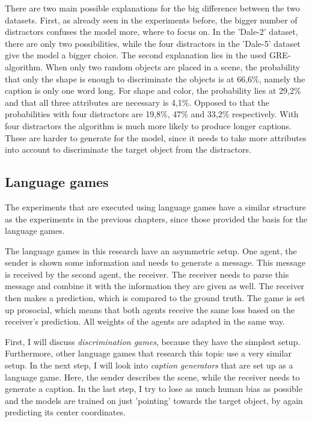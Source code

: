There are two main possible explanations for the big difference between the two datasets.
First, as already seen in the experiments before, the bigger number of distractors confuses the model more, where to focus on.
In the 'Dale-2' dataset, there are only two possibilities, while the four distractors in the 'Dale-5' dataset give the model a bigger choice.
The second explanation lies in the used GRE-algorithm.
When only two random objects are placed in a scene, the probability that only the shape is enough to discriminate the objects is at 66,6\%, namely the caption is only one word long.
For shape and color, the probability lies at 29,2\% and that all three attributes are necessary is 4,1\%.
Opposed to that the probabilities with four distractors are 19,8\%, 47\% and 33,2\% respectively.
With four distractors the algorithm is much more likely to produce longer captions.
These are harder to generate for the model, since it needs to take more attributes into account to discriminate the target object from the distractors.

\subsection{Language games}
\label{sec:language-games}

The experiments that are executed using language games have a similar structure as the experiments in the previous chapters, since those provided the basis for the language games.

The language games in this research have an asymmetric setup.
One agent, the sender is shown some information and needs to generate a message.
This message is received by the second agent, the receiver.
The receiver needs to parse this message and combine it with the information they are given as well.
The receiver then makes a prediction, which is compared to the ground truth.
The game is set up prosocial, which means that both agents receive the same loss based on the receiver's prediction.
All weights of the agents are adapted in the same way.


First, I will discuss \emph{discrimination games}, because they have the simplest setup.
Furthermore, other language games that research this topic use a very similar setup.
In the next step, I will look into \emph{caption generators} that are set up as a language game.
Here, the sender describes the scene, while the receiver needs to generate a caption.
In the last step, I try to lose as much human bias as possible and the models are trained on just 'pointing' towards the target object, by again predicting its center coordinates.

